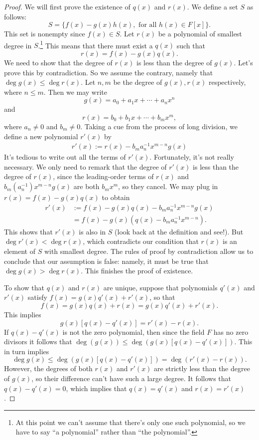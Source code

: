 \begin{proof}
We will first prove the existence of $q(x)$ and $r(x)$. We define a set $S$ as follows: 
\[S = \{f(x) - g(x) h(x), \text{ for all } h(x) \in F[x] \}.\] 
 This set is nonempty since $f(x) \in
S$. 
Let
$r(x)$ be  a polynomial of smallest degree in $S$.\footnote{At this point we can't assume that there's only one such polynomial, so we have to say ``a polynomial'' rather than ``the polynomial''.} This means that there must exist a $q(x)$ such that  
\[
r(x) = f(x) - g(x) q(x).
\]
We need to show that the degree of $r(x)$ is less than the degree of
$g(x)$. Let's prove this by contradiction. So we assume the contrary, namely  that $\deg g(x) \leq \deg r(x)$. 
Let $n,m$ be the degree of $g(x),r(x)$ respectively, where $n \leq m$. Then we may write
\[
g(x) = a_0 + a_1 x + \cdots + a_n x^n
\]
and
\[
r(x) = b_0 + b_1 
x + \cdots + b_m x^m, \]
where $a_n \neq 0$ and $b_m \neq 0$. 
Taking a cue from the process of long division, we define a new polynomial $r'(x)$ by
\begin{align*}
r'(x) := r(x) - b_m a_n^{-1} x^{m-n}g(x)
\end{align*}
It's tedious to write out all the terms of $r'(x)$. Fortunately, it's not really necessary. We only need to remark that the degree of $r'(x)$ is less than the degree of $r(x)$, since the leading-order terms of $r(x)$ and $b_m(a_n^{-1}) x^{m-n}g(x)$ are both $b_m x^m$, so they cancel. We may plug in $r(x) = f(x) - g(x) q(x)$ to obtain
\begin{align*}
r'(x) &:=  f(x) - g(x) q(x) - b_m a_n^{-1}  x^{m-n}g(x)\\
&= f(x) - g(x) \left( q(x) - b_m a_n^{-1}  x^{m-n}\right).
\end{align*}
This shows that $r'(x)$ is also in $S$  (look back at the definition and see!).  But 
$\deg r'(x) < \deg r(x)$, which contradicts our condition that $r(x)$ is an element of $S$ with smallest degree. The rules of proof by contradiction allow us to conclude that our assumption is false: namely, it must be true that $\deg g(x) > \deg r(x)$.
This finishes the proof of existence.

To show that  $q(x)$ and $r(x)$ are unique, suppose that polynomials $q'(x)$ and $r'(x)$ satisfy $f(x) = g(x) q'(x)
+ r'(x)$, so that
\[
f(x) = g(x) q(x) + r(x) = g(x) q'(x) + r'(x).
\]
This implies
\[
g(x) [q(x) - q'(x) ] = r'(x) - r(x).
\]
If $q(x) - q'(x)$ is not the zero polynomial, then since the field $F$ has no zero divisors it follows that $ \deg( g(x)) \leq \deg( g(x) [q(x) - q'(x) ])$. This in turn implies
\[
\deg g(x) \leq \deg( g(x) [q(x) - q'(x) ] )= \deg( r'(x) - r(x) ).
\]
However, the degrees of both $r(x)$ and $r'(x)$ are strictly less than
the degree of $g(x)$, so their difference can't have such a large degree.  It follows that $q(x) - q'(x) = 0$, which implies that $q(x)=q'(x)$ and $r(x)=r'(x)$.
\end{proof}

